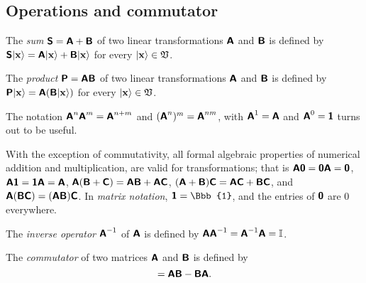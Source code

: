 \subsection{Operations and commutator}
The {\em sum}
$\textsf{\textbf{S}} =\textsf{\textbf{A}} +\textsf{\textbf{B}} $
of two linear transformations $\textsf{\textbf{A}}$ and $\textsf{\textbf{B}} $
is defined by
$\textsf{\textbf{S}} \vert {\bf x} \rangle =\textsf{\textbf{A}}\vert {\bf x} \rangle  +\textsf{\textbf{B}} \vert {\bf x} \rangle $
for every $\vert {\bf x} \rangle \in {\frak V}$.

The {\em product}
$\textsf{\textbf{P}} =\textsf{\textbf{A}} \textsf{\textbf{B}} $
of two linear transformations $\textsf{\textbf{A}}$ and $\textsf{\textbf{B}} $
is defined by
$\textsf{\textbf{P}} \vert {\bf x} \rangle =\textsf{\textbf{A}}(\textsf{\textbf{B}} \vert {\bf x} \rangle )$
for every $\vert {\bf x} \rangle \in {\frak V}$.

The notation
$\textsf{\textbf{A}}^n\textsf{\textbf{A}}^m=\textsf{\textbf{A}}^{n+m}$
and $(\textsf{\textbf{A}}^n)^m= \textsf{\textbf{A}}^{nm}$,
with $\textsf{\textbf{A}}^1=\textsf{\textbf{A}}$ and
$\textsf{\textbf{A}}^0 =\textsf{\textbf{1}}$ turns out to be useful.

With the exception of commutativity, all formal algebraic properties
of numerical addition and multiplication,
are valid for transformations; that is
$
\textsf{\textbf{A}}\textsf{\textbf{0}}=
\textsf{\textbf{0}}\textsf{\textbf{A}} =\textsf{\textbf{0}}
$,
$
\textsf{\textbf{A}}\textsf{\textbf{1}}=
\textsf{\textbf{1}}\textsf{\textbf{A}} =\textsf{\textbf{A}}
$,
$
\textsf{\textbf{A}} (\textsf{\textbf{B}}+\textsf{\textbf{C}})=
\textsf{\textbf{A}} \textsf{\textbf{B}}
+
\textsf{\textbf{A}} \textsf{\textbf{C}}
$,
$
(\textsf{\textbf{A}}+ \textsf{\textbf{B}})\textsf{\textbf{C}}=
\textsf{\textbf{A}} \textsf{\textbf{C}}
+
\textsf{\textbf{B}} \textsf{\textbf{C}}
$,  and
$
\textsf{\textbf{A}} (\textsf{\textbf{B}}\textsf{\textbf{C}})=
(\textsf{\textbf{A}} \textsf{\textbf{B}})
 \textsf{\textbf{C}}
$.
In {\em matrix notation},  $\textsf{\textbf{1}} ={\Bbb{1}}$, and the entries of $\textsf{\textbf{0}}$
are $0$ everywhere.

The {\em inverse operator}
$\textsf{\textbf{A}}^{-1}$
of $\textsf{\textbf{A}}$
is defined by
$\textsf{\textbf{A}}\textsf{\textbf{A}}^{-1}=\textsf{\textbf{A}}^{-1}\textsf{\textbf{A}}=
{\Bbb I}$.


The {\em commutator}
of two matrices $\textsf{\textbf{A}}$  and $\textsf{\textbf{B}}$ is defined by
\begin{equation}
[\textsf{\textbf{A}}, \textsf{\textbf{B}} ]
=
\textsf{\textbf{A}} \textsf{\textbf{B}}
-
 \textsf{\textbf{B}}      \textsf{\textbf{A}}.
\end{equation}

